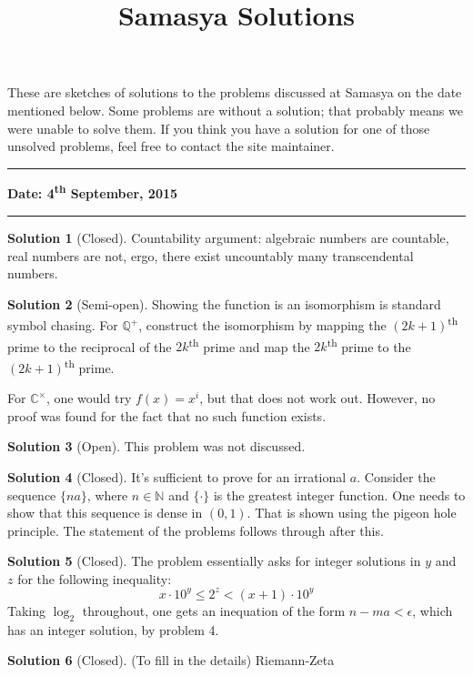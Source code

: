 \documentclass[10pt,a4paper,notitlepage]{article}
\title{\textrm{\textbf{\fontsize{30}{40}\selectfont Samasya Solutions}}}
\date{%
    }
\theoremstyle{definition}
\newtheorem{sol}{Solution}
\begin{document}
\maketitle

These are sketches of solutions to the problems discussed at Samasya on the date mentioned below. Some problems are without a solution; that probably means we were unable to solve them. If you think you have a solution for one of those unsolved problems, feel free to contact the site maintainer. 
\\
\hrule

\textbf{Date: 4\textsuperscript{th} September, 2015}%
\\
\hrule


\begin{sol}[Closed]
Countability argument: algebraic numbers are countable, real numbers are not, ergo, there exist uncountably many transcendental numbers.
\end{sol}

\begin{sol}[Semi-open]
Showing the function is an isomorphism is standard symbol chasing. For $\mathbb{Q}^+$, construct the isomorphism by mapping the $(2k+1)$\textsuperscript{th} prime to the reciprocal of the $2k$\textsuperscript{th} prime and map the $2k$\textsuperscript{th} prime to the $(2k+1)$\textsuperscript{th} prime.

For $\mathbb{C}^\times$, one would try $f(x)= x^i$, but that does not work out. However, no proof was found for the fact that no such function exists.
\end{sol}

\begin{sol}[Open]
This problem was not discussed.
\end{sol}

\begin{sol}[Closed]
It's sufficient to prove for an irrational $a$. Consider the sequence $\{na\}$, where $n \in \mathbb{N}$ and $\{\cdot\}$ is the greatest integer function. One needs to show that this sequence is dense in $(0,1)$. That is shown using the pigeon hole principle. The statement of the problems follows through after this.
\end{sol}

\begin{sol}[Closed]
The problem essentially asks for integer solutions in $y$ and $z$ for the following inequality:
$$ x \cdot 10^y \leq 2^z < (x+1) \cdot 10^y$$
Taking $\log_2$ throughout, one gets an inequation of the form $n-ma < \epsilon$, which has an integer solution, by problem 4.
\end{sol}

\begin{sol}[Closed]
(To fill in the details) Riemann-Zeta
\end{sol}
\end{document}
